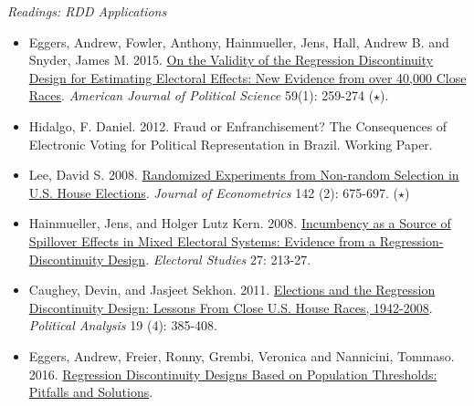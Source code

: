 \documentclass{article}
\begin{document}
\emph{Readings: RDD Applications}
\begin{itemize}
\item Eggers, Andrew, Fowler, Anthony, Hainmueller, Jens, Hall, Andrew B. and Snyder, James M. 2015. \href{http://onlinelibrary.wiley.com/doi/10.1111/ajps.12127/abstract}{On the Validity of the Regression Discontinuity Design for Estimating Electoral Effects: New Evidence from over 40,000 Close Races}. \textit{American Journal of Political Science}  59(1): 259-274 ($\star$).
\item Hidalgo, F. Daniel. 2012. Fraud or Enfranchisement? The Consequences of Electronic Voting for Political Representation in Brazil. Working Paper.
\item Lee, David S. 2008.  \href{http://linkinghub.elsevier.com/retrieve/pii/S0304407607001121} {Randomized Experiments from Non-random Selection in U.S. House Elections}. \textit{Journal of Econometrics} 142 (2): 675-697.  ($\star$)
\item Hainmueller, Jens, and Holger Lutz Kern. 2008. \href{http://www.sciencedirect.com/science/article/pii/S0261379407000996} {Incumbency as a Source of Spillover Effects in Mixed Electoral Systems: Evidence from a Regression-
Discontinuity Design}. \textit{Electoral Studies} 27: 213-27.
\item Caughey, Devin, and Jasjeet Sekhon. 2011. \href{http://pan.oxfordjournals.org/content/19/4/385.abstract}{Elections and the Regression Discontinuity Design: Lessons From Close U.S. House Races, 1942-2008}. \textit{Political Analysis} 19 (4): 385-408.
\item Eggers, Andrew, Freier, Ronny, Grembi, Veronica and Nannicini, Tommaso. 2016. \href{http://andy.egge.rs/papers/EggersFreierGrembiNannicini_pop_thresholds.pdf}{Regression Discontinuity Designs Based on Population Thresholds: Pitfalls and Solutions}.

\end{itemize}
\end{document}
